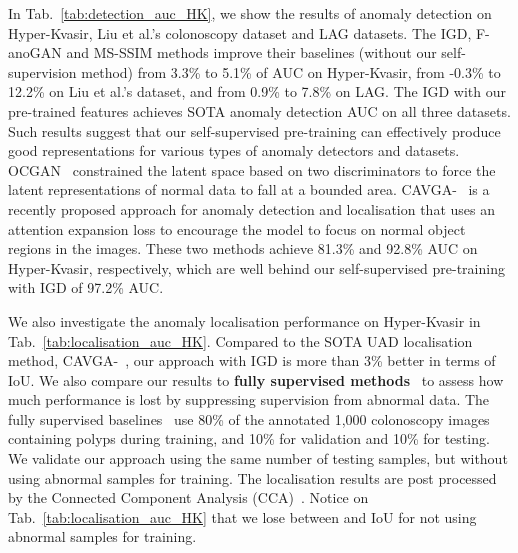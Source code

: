 \documentclass[runningheads]{llncs}
\begin{document}
In Tab.~\ref{tab:detection_auc_HK}, we show the results of anomaly detection on Hyper-Kvasir, Liu et al.'s colonoscopy dataset and LAG datasets. 
The IGD, F-anoGAN and MS-SSIM methods improve their baselines (without our self-supervision method) from 3.3\% to  5.1\% of AUC on Hyper-Kvasir, from -0.3\% to 12.2\% on Liu et al.'s dataset, and from 0.9\% to 7.8\% on LAG. 
The IGD with our pre-trained features achieves SOTA anomaly detection AUC on all three datasets. Such results suggest that our self-supervised pre-training can effectively produce good representations for various types of anomaly detectors and datasets.  
OCGAN~\cite{perera2019ocgan} constrained the latent space based on two discriminators to force the latent representations of normal data to fall at a bounded area. CAVGA-~\cite{venkataramanan2020attention} is a recently proposed approach for anomaly detection and localisation that uses an attention expansion loss to encourage the model to focus on normal object regions in the images. 
These two methods achieve 81.3\% and 92.8\% AUC on Hyper-Kvasir, respectively, which are well behind our self-supervised pre-training with IGD of 97.2\% AUC. 


We also investigate the anomaly localisation performance on Hyper-Kvasir in Tab.~\ref{tab:localisation_auc_HK}.
Compared to the SOTA UAD localisation method, CAVGA-~\cite{venkataramanan2020attention}, our approach with IGD is more than 3\% better in terms of IoU.
We also compare our results to \textbf{fully supervised methods}~\cite{ronneberger2015u,zhou2018unet++,diakogiannis2020resunet,fang2019selective} to assess how much performance is lost by suppressing supervision from abnormal data.
The fully supervised baselines~\cite{ronneberger2015u,zhou2018unet++,diakogiannis2020resunet,fang2019selective} use 80\% of the annotated 1,000 colonoscopy images containing polyps during training, and 10\% for validation and 10\% for testing. 
We validate our approach using the same number of testing samples, but without using abnormal samples for training. 
The localisation results are post processed by the Connected Component Analysis (CCA)~\cite{chai1999significance}.
Notice on Tab.~\ref{tab:localisation_auc_HK} that we lose between  and  IoU for not using  abnormal samples for training.
\end{document}
